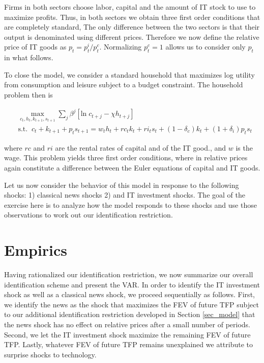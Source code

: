 \documentclass[11pt]{article}
\renewcommand{\[}{\begin{equation}}
\renewcommand{\]}{\end{equation}}
\begin{document}
Firms in both sectors choose labor, capital and the amount of IT stock to use to maximize profits. Thus, in both sectors we obtain three first order conditions that are completely standard, The only difference between the two sectors is that their output is denominated using different prices. Therefore we now define the relative price of IT goods as $p_t = p^i_t / p^c_t$. Normalizing $p^c_t = 1$ allows us to consider only $p_t$ in what follows. 

To close the model, we consider a standard household that maximizes log utility from consumption and leisure subject to a budget constraint. The household problem then is

\begin{align}
& \max_{c_t, h_t, k_{t+1}, s_{t+1}} \sum_j \beta^j \left[ \text{ln} \;  c_{t+j} - \chi h_{t+j} \right] \\
& \text{s.t.} \; \; c_t + k_{t+1} + p_t s_{t+1} = w_t h_t + rc_t k_t + ri_t s_t + (1-\delta_c)k_t + (1+ \delta_i)p_t s_t
\end{align}

where $rc$ and $ri$ are the rental rates of capital and of the IT good., and $w$ is the wage. This problem yields three first order conditions, where in relative prices again constitute a difference between the Euler equations of capital and IT goods. 

Let us now consider the behavior of this model in response to the following shocks: 1) classical news shocks 2) and IT investment shocks. The goal of the exercise here is to analyze how the model responds to these shocks and use those observations to work out our identification restriction. 

\label{sec_model}

\section{Empirics}
\label{sec_empirics}
Having rationalized our identification restriction, we now summarize our overall identification scheme and present the VAR. In order to identify the IT investment shock as well as a classical news shock, we proceed sequentially as follows. First, we identify the news as the shock that maximizes the FEV of future TFP subject to our additional identification restriction developed in Section \ref{sec_model} that the news shock has no effect on relative prices after a small number of periods. Second, we let the IT investment shock maximize the remaining FEV of future TFP. Lastly, whatever FEV of future TFP remains unexplained we attribute to surprise shocks to technology. 
\end{document}
